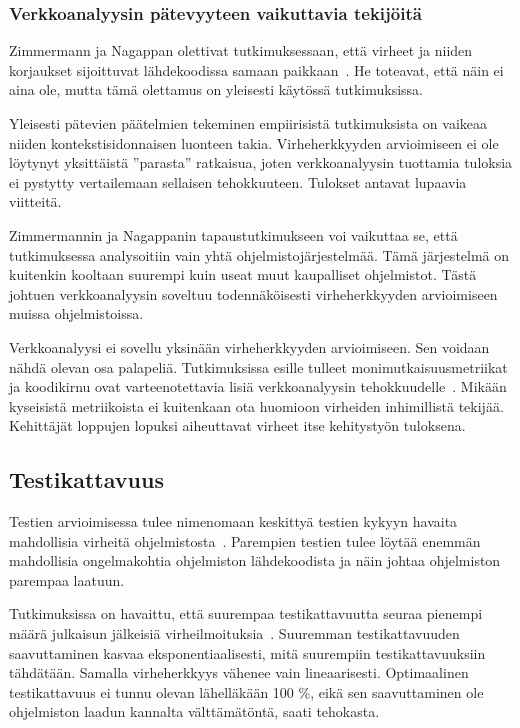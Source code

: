 \documentclass[finnish]{../tktltiki2}
\theoremstyle{definition}
\theoremstyle{remark}
\begin{document}
\subsubsection{Verkkoanalyysin pätevyyteen vaikuttavia tekijöitä}

Zimmermann ja Nagappan olettivat tutkimuksessaan, että virheet ja niiden korjaukset sijoittuvat lähdekoodissa samaan 
paikkaan~\cite{ZN08}. He toteavat, että näin ei aina ole, mutta tämä olettamus on yleisesti käytössä tutkimuksissa.

    Yleisesti pätevien päätelmien tekeminen empiirisistä tutkimuksista on vaikeaa niiden kontekstisidonnaisen luonteen 
takia. Virheherkkyyden arvioimiseen ei ole löytynyt yksittäistä ''parasta'' ratkaisua, joten verkkoanalyysin tuottamia 
tuloksia ei pystytty vertailemaan sellaisen tehokkuuteen. Tulokset antavat lupaavia viitteitä.

   Zimmermannin ja Nagappanin tapaustutkimukseen voi vaikuttaa se, että tutkimuksessa analysoitiin vain yhtä 
ohjelmistojärjestelmää. Tämä järjestelmä on kuitenkin kooltaan suurempi kuin useat muut kaupalliset ohjelmistot. Tästä 
johtuen verkkoanalyysin soveltuu todennäköisesti virheherkkyyden arvioimiseen muissa ohjelmistoissa. 

    Verkkoanalyysi ei sovellu yksinään virheherkkyyden arvioimiseen. Sen voidaan nähdä olevan osa palapeliä. 
Tutkimuksissa esille tulleet monimutkaisuusmetriikat ja koodikirnu ovat varteenotettavia lisiä verkkoanalyysin 
tehokkuudelle~\cite{ZN08}. Mikään kyseisistä metriikoista ei kuitenkaan ota huomioon virheiden inhimillistä tekijää. 
Kehittäjät loppujen lopuksi aiheuttavat virheet itse kehitystyön tuloksena.

\subsection{Testikattavuus}

Testien arvioimisessa tulee nimenomaan keskittyä testien kykyyn havaita mahdollisia virheitä 
ohjelmistosta~\cite{MNDT09}. Parempien testien tulee löytää enemmän mahdollisia ongelmakohtia ohjelmiston lähdekoodista 
ja näin johtaa ohjelmiston parempaa laatuun.

    Tutkimuksissa on havaittu, että suurempaa testikattavuutta seuraa pienempi määrä julkaisun jälkeisiä 
virheilmoituksia~\cite{MNDT09}. Suuremman testikattavuuden saavuttaminen kasvaa eksponentiaalisesti, mitä suurempiin 
testikattavuuksiin tähdätään. Samalla virheherkkyys vähenee vain lineaarisesti. Optimaalinen testikattavuus ei tunnu 
olevan lähelläkään 100 \%, eikä sen saavuttaminen ole ohjelmiston laadun kannalta välttämätöntä, saati tehokasta.
\end{document}
